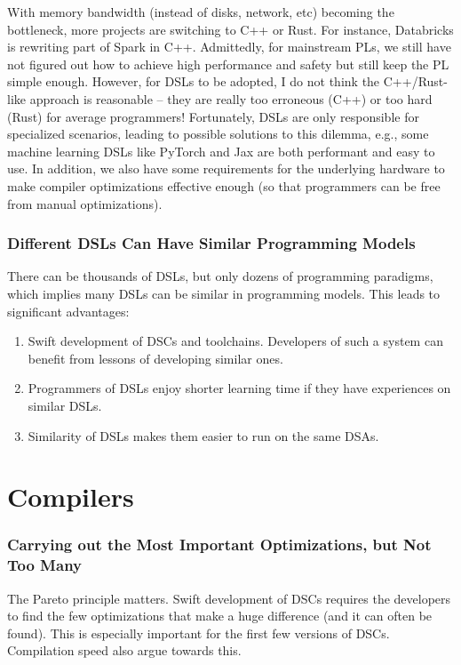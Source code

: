 \documentclass[11pt]{article}
\begin{document}

With memory bandwidth (instead of disks, network, etc) becoming the bottleneck, more projects are switching to C++ or Rust.
For instance, Databricks is rewriting part of Spark in C++.
Admittedly, for mainstream PLs, we still have not figured out how to achieve high performance and safety but still keep the PL simple enough.
However, for DSLs to be adopted, I do not think the C++/Rust-like approach is reasonable -- they are really too erroneous (C++) or too hard (Rust) for average programmers!
Fortunately, DSLs are only responsible for specialized scenarios, leading to possible solutions to this dilemma, e.g., some machine learning DSLs like PyTorch and Jax are both performant and easy to use.
In addition, we also have some requirements for the underlying hardware to make compiler optimizations effective enough (so that programmers can be free from manual optimizations).

\subsubsection*{Different DSLs Can Have Similar Programming Models}
There can be thousands of DSLs, but only dozens of programming paradigms, which implies many DSLs can be similar in programming models.
This leads to significant advantages:
\begin{enumerate}
    \item Swift development of DSCs and toolchains.
    Developers of such a system can benefit from lessons of developing similar ones.
    \item Programmers of DSLs enjoy shorter learning time if they have experiences on similar DSLs.
    \item Similarity of DSLs makes them easier to run on the same DSAs.
\end{enumerate}
\section{Compilers}
\subsubsection*{Carrying out the Most Important Optimizations, but Not Too Many}
The Pareto principle matters.
Swift development of DSCs requires the developers to find the few optimizations that make a huge difference (and it can often be found).
This is especially important for the first few versions of DSCs.
Compilation speed also argue towards this.
\end{document}
